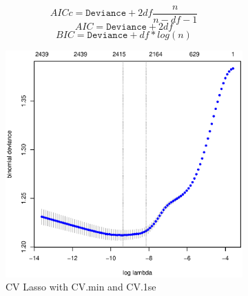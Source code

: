 \documentclass[11pt, fleqn]{article}
\begin{document}
\begin{equation}
  AICc = \texttt{Deviance} + 2df\frac{n}{n-df-1}
  \label{eq:AICc}
\end{equation}
\begin{equation}
  AIC = \texttt{Deviance} + 2df
  \label{eq:AIC}
\end{equation}
\begin{equation}
  BIC = \texttt{Deviance} + df * log(n)
  \label{eq:BIC}
\end{equation}

\begin{figure}
  \centering
  \begin{subfigure}[b]{0.49\textwidth}
    \includegraphics[width=\textwidth]{pl_cv_nhl_gamlr_a.eps}
    \caption{CV Lasso with CV.min and CV.1se}
    \label{fig:pl_cv_nhl}
  \end{subfigure}
  \hfill
  \begin{subfigure}[b]{0.49\textwidth}

\end{subfigure}
\end{figure}
\end{document}
